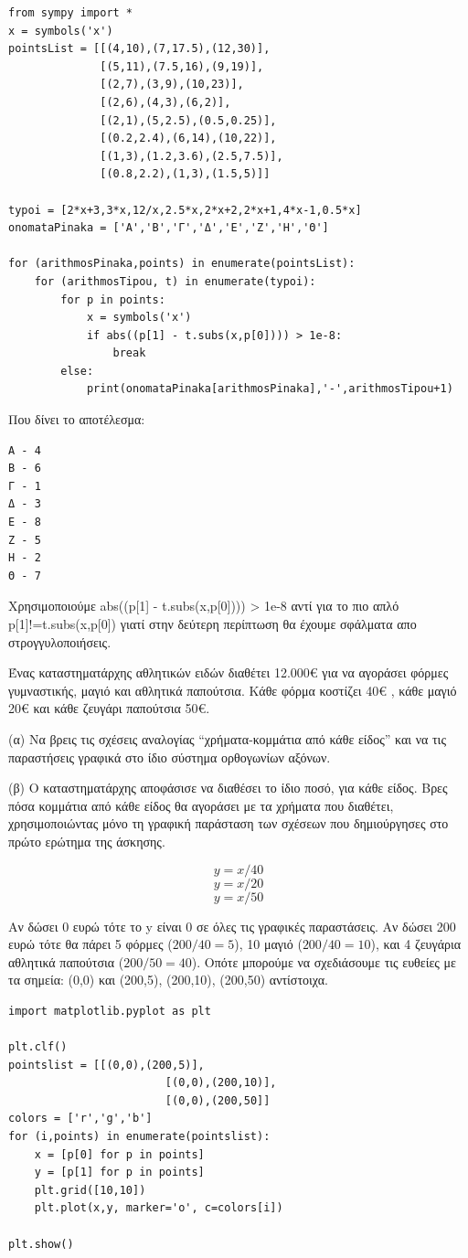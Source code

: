 \begin{lstlisting}
from sympy import *
x = symbols('x')
pointsList = [[(4,10),(7,17.5),(12,30)],
              [(5,11),(7.5,16),(9,19)],
              [(2,7),(3,9),(10,23)],
              [(2,6),(4,3),(6,2)],
              [(2,1),(5,2.5),(0.5,0.25)],
              [(0.2,2.4),(6,14),(10,22)],
              [(1,3),(1.2,3.6),(2.5,7.5)],
              [(0.8,2.2),(1,3),(1.5,5)]]

typoi = [2*x+3,3*x,12/x,2.5*x,2*x+2,2*x+1,4*x-1,0.5*x]
onomataPinaka = ['Α','Β','Γ','Δ','Ε','Ζ','Η','Θ']

for (arithmosPinaka,points) in enumerate(pointsList):
    for (arithmosTipou, t) in enumerate(typoi):
        for p in points:
            x = symbols('x')
            if abs((p[1] - t.subs(x,p[0]))) > 1e-8:
                break
        else:
            print(onomataPinaka[arithmosPinaka],'-',arithmosTipou+1)
\end{lstlisting}

Που δίνει το αποτέλεσμα:

\begin{lstlisting}
Α - 4
Β - 6
Γ - 1
Δ - 3
Ε - 8
Ζ - 5
Η - 2
Θ - 7
\end{lstlisting}

Χρησιμοποιούμε abs((p[1] - t.subs(x,p[0]))) > 1e-8 αντί για το πιο απλό p[1]!=t.subs(x,p[0]) γιατί στην δεύτερη περίπτωση θα έχουμε σφάλματα απο στρογγυλοποιήσεις.

\begin{exercise}
Ένας καταστηματάρχης αθλητικών ειδών διαθέτει 12.000€ για να αγοράσει φόρμες γυμναστικής, μαγιό και αθλητικά παπούτσια. Κάθε φόρμα κοστίζει 40€ , κάθε μαγιό 20€ και κάθε ζευγάρι παπούτσια 50€. 

(α)  Να βρεις τις σχέσεις αναλογίας “χρήματα-κομμάτια από κάθε είδος” και να τις  παραστήσεις γραφικά στο ίδιο σύστημα ορθογωνίων αξόνων. 

(β)  Ο καταστηματάρχης αποφάσισε να διαθέσει το ίδιο ποσό, για κάθε είδος. Βρες  πόσα κομμάτια από κάθε είδος θα αγοράσει με τα χρήματα που διαθέτει,   χρησιμοποιώντας μόνο τη γραφική παράσταση των σχέσεων που δημιούργησες  στο πρώτο ερώτημα της άσκησης.
\end{exercise}
$$y = x/40$$
$$y = x/20$$
$$y = x/50$$

Αν δώσει 0 ευρώ τότε το y είναι 0 σε όλες τις γραφικές παραστάσεις. Αν δώσει 200 ευρώ τότε θα πάρει 5 φόρμες ($200/40=5$), 10 μαγιό ($200/40=10$), και 4 ζευγάρια αθλητικά παπούτσια ($200/50=40$).
Οπότε μπορούμε να σχεδιάσουμε τις ευθείες με τα σημεία: (0,0) και (200,5), (200,10), (200,50) αντίστοιχα. 
\begin{lstlisting}
import matplotlib.pyplot as plt

plt.clf()
pointslist = [[(0,0),(200,5)],
                        [(0,0),(200,10)],
                        [(0,0),(200,50]]
colors = ['r','g','b']
for (i,points) in enumerate(pointslist):
    x = [p[0] for p in points]
    y = [p[1] for p in points]
    plt.grid([10,10])
    plt.plot(x,y, marker='o', c=colors[i])

plt.show()
\end{lstlisting}

